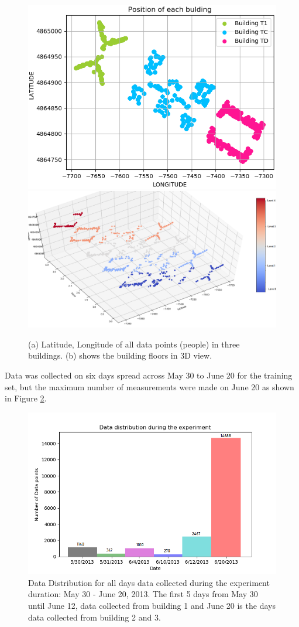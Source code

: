\begin{figure}[!h]
    \centering
    \includegraphics[width = 7 cm]{image/Chapters/Chapter6/LatLong.png}\hfill
    \includegraphics[width = 8 cm]{image/Chapters/Chapter6/LatLongFloor.png}
    \\[\smallskipamount]    
    \caption{(a) Latitude, Longitude of all data points (people) in three buildings. (b) shows the building floors in 3D view.}
    \label{nama}
\end{figure}

Data was collected on six days spread across May 30 to June 20 for the training set, but the maximum number of measurements were made on June 20 as shown in Figure \ref{timeline}. 



\begin{figure}
    \centering
    \includegraphics[width = 12 cm]{image/Chapters/Chapter6/timedist.png}
    \caption{Data Distribution for all days data collected during the experiment duration: May 30 - June 20, 2013. The first 5  days from May 30 until June 12, data collected from building 1 and June 20 is the days data collected from building 2 and 3.}
    \label{timeline}
\end{figure}


